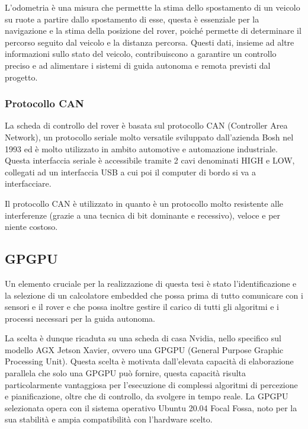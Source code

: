 \noindent L'odometria è una misura che permettte la stima dello spostamento di un veicolo su ruote a partire dallo spostamento di esse, questa è essenziale per la navigazione e la stima della posizione del rover, poiché permette di determinare il percorso seguito dal veicolo e la distanza percorsa. Questi dati, insieme ad altre informazioni sullo stato del veicolo, contribuiscono a garantire un controllo preciso e ad alimentare i sistemi di guida autonoma e remota previsti dal progetto.

\subsubsection{Protocollo CAN}
La scheda di controllo del rover è basata sul protocollo CAN (Controller Area Network), un protocollo seriale molto versatile sviluppato dall'azienda Bosh nel 1993 ed è molto utilizzato in ambito automotive e automazione industriale. Questa interfaccia seriale è accessibile tramite 2 cavi denominati HIGH e LOW, collegati ad un interfaccia USB a cui poi il computer di bordo si va a interfacciare.

\noindent Il protocollo CAN è utilizzato in quanto è un protocollo molto resistente alle interferenze (grazie a una tecnica di bit dominante e recessivo), veloce e per niente costoso.  

\subsection{GPGPU}
Un elemento cruciale per la realizzazione di questa tesi è stato l'identificazione e la selezione di un calcolatore embedded che possa prima di tutto comunicare con i sensori e il rover e che possa inoltre gestire il carico di tutti gli algoritmi e i processi necessari per la guida autonoma.

\noindent La scelta è dunque ricaduta su una scheda di casa Nvidia, nello specifico sul modello AGX Jetson Xavier, ovvero una GPGPU (General Purpose Graphic Processing Unit). Questa scelta è motivata dall'elevata capacità di elaborazione parallela che solo una GPGPU può fornire, questa capacità risulta particolarmente vantaggiosa per l'esecuzione di complessi algoritmi di percezione e pianificazione, oltre che di controllo, da svolgere in tempo reale. La GPGPU selezionata opera con il sistema operativo Ubuntu 20.04 Focal Fossa, noto per la sua stabilità e ampia compatibilità con l'hardware scelto.

